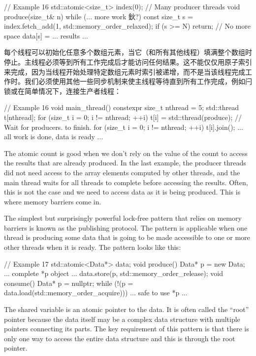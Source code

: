 \begin{code}
// Example 16
std::atomic<size_t> index(0);
// Many producer threads
void produce(size_t& n) {
  while (... more work 鈥?) {
    const size_t s =
      index.fetch_add(1, std::memory_order_relaxed);
    if (s >= N) return;     // No more space
    data[s] = ... results ...
  }
}
\end{code}

每个线程可以初始化任意多个数组元素，当它（和所有其他线程）填满整个数组时停止。主线程必须等到所有工作完成后才能访问任何结果。这不能仅仅用原子索引来完成，因为当线程开始处理特定数组元素时索引被递增，而不是当该线程完成工作时。我们必须使用其他一些同步机制来使主线程等待直到所有工作完成，例如闩锁或在简单情况下，连接生产者线程：

\begin{code}
// Example 16
void main_thread() {
  constexpr size_t nthread = 5;
  std::thread t[nthread];
  for (size_t i = 0; i != nthread; ++i) {
    t[i] = std::thread(produce);
  }
  // Wait for producers. to finish.
  for (size_t i = 0; i != nthread; ++i) {
    t[i].join();
  }
  ... all work is done, data is ready ...
}
\end{code}

The atomic count is good when we don't rely on the value of the count to access the results that are already produced. In the last example, the producer threads did not need access to the array elements computed by other threads, and the main thread waits for all threads to complete before accessing the results. Often, this is not the case and we need to access data as it is being produced. This is where memory barriers come in.

The simplest but surprisingly powerful lock-free pattern that relies on memory barriers is known as the publishing protocol. The pattern is applicable when one thread is producing some data that is going to be made accessible to one or more other threads when it is ready. The pattern looks like this:

\begin{code}
// Example 17
std::atomic<Data*> data;
void produce() {
  Data* p = new Data;
  ... complete *p object ...
  data.store(p, std::memory_order_release);
}
void consume() {
  Data* p = nullptr;
  while (!(p = data.load(std::memory_order_acquire))) {}
  ... safe to use *p ...
}
\end{code}

The shared variable is an atomic pointer to the data. It is often called the ``root'' pointer because the data itself may be a complex data structure with multiple pointers connecting its parts. The key requirement of this pattern is that there is only one way to access the entire data structure and this is through the root pointer.

